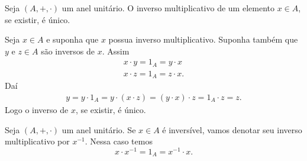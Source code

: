 \begin{proposicao}
    Seja $(A, +, \cdot)$ um anel unitário. O inverso multiplicativo de um elemento $x \in A$, se existir, é único.
\end{proposicao}
\begin{prova}
    Seja $x \in A$ e suponha que $x$ possua inverso multiplicativo. Suponha também que $y$ e $z \in A$ são inversos de $x$. Assim
    \begin{align*}
        x\cdot y = 1_A = y \cdot x\\
        x\cdot z = 1_A = z \cdot x.
    \end{align*}
Daí
    \begin{align*}
        y = y \cdot 1_A = y\cdot (x\cdot z) = (y\cdot x)\cdot z = 1_A \cdot z = z.
    \end{align*}
Logo o inverso de $x$, se existir, é único.
\end{prova}

\begin{definicao}
    Seja $(A, +, \cdot)$ um anel unitário. Se $x \in A$ é inversível, vamos denotar seu inverso multiplicativo por $x^{-1}$. Nessa caso temos
    \[
        x \cdot x^{-1} = 1_A = x^{-1}\cdot x.
    \]
\end{definicao}


